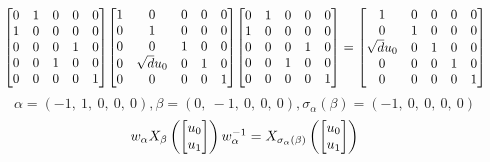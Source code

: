 \documentclass[11pt]{article}
\theoremstyle{definition}
\begin{document}
\[
\scaletoalign{\textwidth}{{\left[\begin{matrix}0 & 1 & 0 & 0 & 0\\1 & 0 & 0 & 0 & 0\\0 & 0 & 0 & 1 & 0\\0 & 0 & 1 & 0 & 0\\0 & 0 & 0 & 0 & 1\end{matrix}\right]} {\left[\begin{matrix}1 & 0 & 0 & 0 & 0\\0 & 1 & 0 & 0 & 0\\0 & 0 & 1 & 0 & 0\\0 & \sqrt{d} u_{0} & 0 & 1 & 0\\0 & 0 & 0 & 0 & 1\end{matrix}\right]} {\left[\begin{matrix}0 & 1 & 0 & 0 & 0\\1 & 0 & 0 & 0 & 0\\0 & 0 & 0 & 1 & 0\\0 & 0 & 1 & 0 & 0\\0 & 0 & 0 & 0 & 1\end{matrix}\right]} = {\left[\begin{matrix}1 & 0 & 0 & 0 & 0\\0 & 1 & 0 & 0 & 0\\\sqrt{d} u_{0} & 0 & 1 & 0 & 0\\0 & 0 & 0 & 1 & 0\\0 & 0 & 0 & 0 & 1\end{matrix}\right]}}
\]
\[
\alpha = \left( -1, \  1, \  0, \  0, \  0\right), \beta = \left( 0, \  -1, \  0, \  0, \  0\right), \sigma_{\alpha}(\beta) = \left( -1, \  0, \  0, \  0, \  0\right)
\]
\[
\scaletoalign{\textwidth}{w_{\alpha} X_{\beta}\left(\left[\begin{matrix}u_{0}\\u_{1}\end{matrix}\right]\right) w_{\alpha}^{-1} = X_{\sigma_{\alpha}\left(\beta\right)}\left(\left[\begin{matrix}u_{0}\\u_{1}\end{matrix}\right]\right)}
\]
\end{document}
